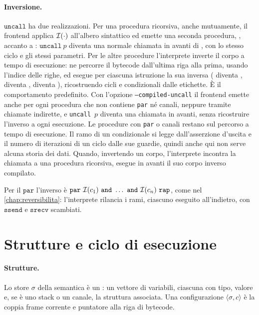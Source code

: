 \paragraph{Inversione.} $\mathtt{uncall}$ ha due realizzazioni. Per una
procedura ricorsiva, anche mutuamente, il frontend applica $\mathcal{I}(\cdot)$
all'albero sintattico ed emette una seconda procedura, , accanto
a : $\mathtt{uncall}\ p$ diventa una normale chiamata in avanti di
, con lo stesso ciclo e gli stessi parametri. Per le altre
procedure l'interprete inverte il corpo a tempo di esecuzione: ne percorre il
bytecode dall'ultima riga alla prima, usando l'indice delle righe, ed esegue
per ciascuna istruzione la sua inversa ( diventa ,
 diventa ,  diventa ),
ricostruendo cicli e condizionali dalle etichette. È il comportamento
predefinito. Con l'opzione \texttt{--compiled-uncall} il frontend emette
 anche per ogni procedura che non contiene \texttt{par} né
canali, neppure tramite chiamate indirette, e \texttt{uncall}~$p$ diventa una
chiamata in avanti, senza ricostruire l'inverso a ogni esecuzione. Le
procedure con \texttt{par} o canali restano sul percorso a tempo di
esecuzione. Il ramo di un condizionale si legge dall'asserzione d'uscita e il
numero di iterazioni di un ciclo dalle sue guardie, quindi anche qui non serve
alcuna storia dei dati. Quando, invertendo un corpo, l'interprete incontra la
chiamata a una procedura ricorsiva, esegue in avanti il suo corpo inverso
compilato.

\noindent
Per il $\mathtt{par}$ l'inverso è $\mathtt{par}\ \Inv{c_1}\ \mathtt{and}\
\dots\ \mathtt{and}\ \Inv{c_n}\ \mathtt{rap}$, come nel \cref{chap:reversibilita}:
l'interprete rilancia i rami, ciascuno eseguito all'indietro, con
$\mathtt{ssend}$ e $\mathtt{srecv}$ scambiati.

\section{Strutture e ciclo di esecuzione}
\label{sec:interprete}

\paragraph{Strutture.} Lo store $\sigma$ della semantica è un : un
vettore di variabili, ciascuna con tipo, valore e, se è uno stack o un canale, la
struttura associata. Una configurazione $\langle \sigma, c\rangle$ è la coppia
frame corrente e puntatore alla riga di bytecode.

